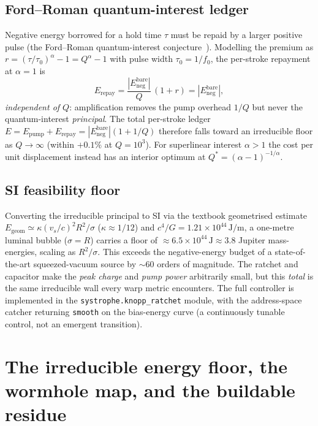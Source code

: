 \documentclass[11pt,a4paper]{article}
\begin{document}
\subsection{Ford--Roman quantum-interest ledger}
Negative energy borrowed for a hold time $\tau$ must be repaid by a larger positive pulse (the Ford--Roman quantum-interest conjecture~\cite{FordRoman1999}). Modelling the premium as $r=(\tau/\tau_{0})^{\alpha}-1=Q^{\alpha}-1$ with pulse width $\tau_{0}=1/f_{0}$, the per-stroke repayment at $\alpha=1$ is
\begin{equation}
E_{\mathrm{repay}}=\frac{|E_{\mathrm{neg}}^{\mathrm{bare}}|}{Q}\,(1+r)=|E_{\mathrm{neg}}^{\mathrm{bare}}|,
\end{equation}
\emph{independent of $Q$}: amplification removes the pump overhead $1/Q$ but never the quantum-interest \emph{principal}. The total per-stroke ledger $E=E_{\mathrm{pump}}+E_{\mathrm{repay}}=|E_{\mathrm{neg}}^{\mathrm{bare}}|(1+1/Q)$ therefore falls toward an irreducible floor as $Q\to\infty$ (within $+0.1\%$ at $Q=10^{3}$). For superlinear interest $\alpha>1$ the cost per unit displacement instead has an interior optimum at $Q^{*}=(\alpha-1)^{-1/\alpha}$.

\subsection{SI feasibility floor}
Converting the irreducible principal to SI via the textbook geometrised estimate $E_{\mathrm{geom}}\simeq\kappa(v_{s}/c)^{2}R^{2}/\sigma$ ($\kappa\approx1/12$) and $c^{4}/G=1.21\times10^{44}\,\mathrm{J/m}$, a one-metre luminal bubble ($\sigma=R$) carries a floor of $\approx6.5\times10^{44}\,\mathrm{J}\approx3.8$ Jupiter mass-energies, scaling as $R^{2}/\sigma$. This exceeds the negative-energy budget of a state-of-the-art squeezed-vacuum source by $\sim\!60$ orders of magnitude. The ratchet and capacitor make the \emph{peak charge} and \emph{pump power} arbitrarily small, but this \emph{total} is the same irreducible wall every warp metric encounters. The full controller is implemented in the \texttt{systrophe.knopp\_ratchet} module, with the address-space catcher returning \texttt{smooth} on the bias-energy curve (a continuously tunable control, not an emergent transition).

\section{The irreducible energy floor, the wormhole map, and the buildable residue}\label{sec:floor}
\end{document}
